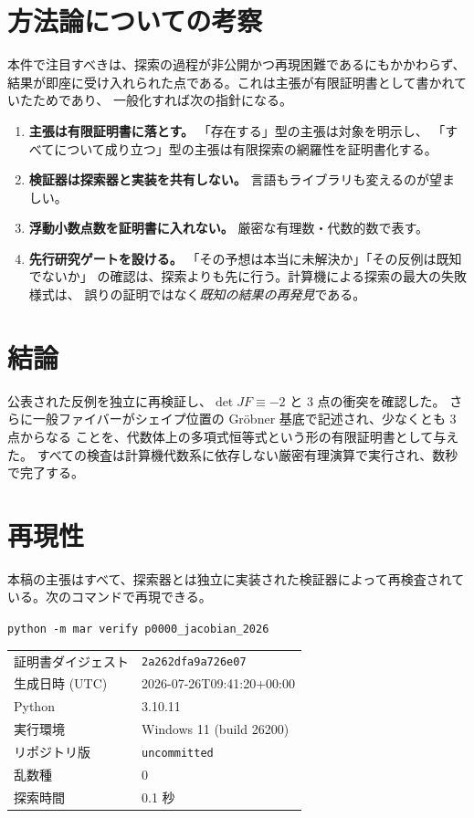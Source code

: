 \documentclass[paper=a4,fontsize=10.5pt,jafontsize=10.5pt]{jlreq}
\theoremstyle{plain}
\theoremstyle{definition}
\begin{document}
\section{方法論についての考察}

本件で注目すべきは、探索の過程が非公開かつ再現困難であるにもかかわらず、
結果が即座に受け入れられた点である。これは主張が有限証明書として書かれていたためであり、
一般化すれば次の指針になる。

\begin{enumerate}
\item \textbf{主張は有限証明書に落とす。} 「存在する」型の主張は対象を明示し、
  「すべてについて成り立つ」型の主張は有限探索の網羅性を証明書化する。
\item \textbf{検証器は探索器と実装を共有しない。} 言語もライブラリも変えるのが望ましい。
\item \textbf{浮動小数点数を証明書に入れない。} 厳密な有理数・代数的数で表す。
\item \textbf{先行研究ゲートを設ける。} 「その予想は本当に未解決か」「その反例は既知でないか」
  の確認は、探索よりも先に行う。計算機による探索の最大の失敗様式は、
  誤りの証明ではなく\textit{既知の結果の再発見}である。
\end{enumerate}

\section{結論}

公表された反例を独立に再検証し、$\det JF \equiv -2$ と 3 点の衝突を確認した。
さらに一般ファイバーがシェイプ位置の Gr\"obner 基底で記述され、少なくとも 3 点からなる
ことを、代数体上の多項式恒等式という形の有限証明書として与えた。
すべての検査は計算機代数系に依存しない厳密有理演算で実行され、数秒で完了する。


\section*{再現性}
本稿の主張はすべて、探索器とは独立に実装された検証器によって再検査されている。次のコマンドで再現できる。

\begin{center}\texttt{python -m mar verify p0000\_jacobian\_2026}\end{center}

\begin{center}\begin{tabular}{ll}\toprule
証明書ダイジェスト & \texttt{2a262dfa9a726e07} \\
生成日時 (UTC) & 2026-07-26T09:41:20+00:00 \\
Python & 3.10.11 \\
実行環境 & Windows 11 (build 26200) \\
リポジトリ版 & \texttt{uncommitted} \\
乱数種 & 0 \\
探索時間 & 0.1 秒 \\
\bottomrule\end{tabular}\end{center}
\end{document}
